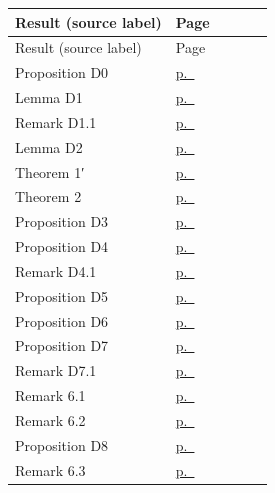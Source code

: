 \begin{center}\footnotesize
\begin{longtable}{@{}L{0.62\linewidth}l@{}}
\toprule Result (source label) & Page \\ \midrule\endfirsthead
\toprule Result (source label) & Page \\ \midrule\endhead
Proposition D0 & \hyperref[pC-res-proposition-D0]{p.~\pageref{pC-res-proposition-D0}} \\
Lemma D1 & \hyperref[pC-res-lemma-D1]{p.~\pageref{pC-res-lemma-D1}} \\
Remark D1.1 & \hyperref[pC-res-remark-D1.1]{p.~\pageref{pC-res-remark-D1.1}} \\
Lemma D2 & \hyperref[pC-res-lemma-D2]{p.~\pageref{pC-res-lemma-D2}} \\
Theorem 1′ & \hyperref[pC-res-theorem-1p]{p.~\pageref{pC-res-theorem-1p}} \\
Theorem 2 & \hyperref[pC-res-theorem-2]{p.~\pageref{pC-res-theorem-2}} \\
Proposition D3 & \hyperref[pC-res-proposition-D3]{p.~\pageref{pC-res-proposition-D3}} \\
Proposition D4 & \hyperref[pC-res-proposition-D4]{p.~\pageref{pC-res-proposition-D4}} \\
Remark D4.1 & \hyperref[pC-res-remark-D4.1]{p.~\pageref{pC-res-remark-D4.1}} \\
Proposition D5 & \hyperref[pC-res-proposition-D5]{p.~\pageref{pC-res-proposition-D5}} \\
Proposition D6 & \hyperref[pC-res-proposition-D6]{p.~\pageref{pC-res-proposition-D6}} \\
Proposition D7 & \hyperref[pC-res-proposition-D7]{p.~\pageref{pC-res-proposition-D7}} \\
Remark D7.1 & \hyperref[pC-res-remark-D7.1]{p.~\pageref{pC-res-remark-D7.1}} \\
Remark 6.1 & \hyperref[pC-res-remark-6.1]{p.~\pageref{pC-res-remark-6.1}} \\
Remark 6.2 & \hyperref[pC-res-remark-6.2]{p.~\pageref{pC-res-remark-6.2}} \\
Proposition D8 & \hyperref[pC-res-proposition-D8]{p.~\pageref{pC-res-proposition-D8}} \\
Remark 6.3 & \hyperref[pC-res-remark-6.3]{p.~\pageref{pC-res-remark-6.3}} \\
\bottomrule
\end{longtable}
\end{center}

